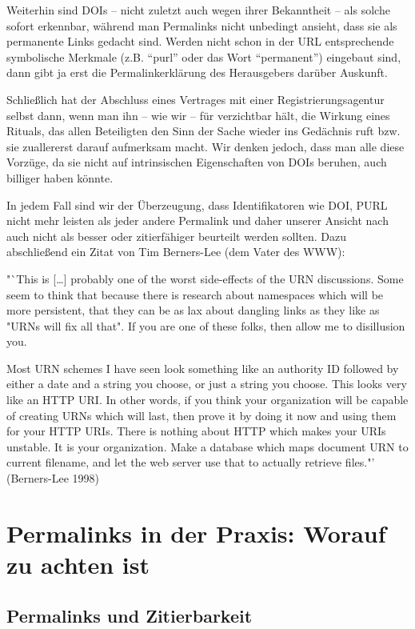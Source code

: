 \documentclass[12pt, a4paper]{article}
\begin{document}
Weiterhin sind DOIs -- nicht zuletzt auch wegen ihrer Bekanntheit --
als solche sofort erkennbar, während man Permalinks nicht unbedingt
ansieht, dass sie als permanente Links gedacht sind. Werden nicht schon in der URL
entsprechende symbolische Merkmale (z.B. ``purl'' oder das Wort
``permanent'') eingebaut sind, dann gibt ja erst die
Permalinkerklärung des Herausgebers darüber Auskunft.

Schließlich hat
der Abschluss eines Vertrages mit einer Registrierungsagentur selbst
dann, wenn man ihn -- wie wir -- für verzichtbar hält, die Wirkung eines
Rituals, das allen Beteiligten den Sinn der Sache wieder ins Gedächnis
ruft bzw. sie zuallererst darauf aufmerksam macht. Wir denken jedoch,
dass man alle diese Vorzüge, da sie nicht auf intrinsischen
Eigenschaften von DOIs beruhen, auch billiger haben könnte.

In jedem Fall sind wir der Überzeugung, dass Identifikatoren wie DOI,
PURL nicht mehr leisten als jeder andere Permalink und daher unserer
Ansicht nach auch nicht als besser oder zitierfähiger beurteilt werden
sollten. Dazu abschließend ein Zitat von Tim Berners-Lee (dem Vater
des WWW):

"`This is {[}\ldots{}{]} probably one of the worst side-effects of the
URN discussions. Some seem to think that because there is research
about namespaces which will be more persistent, that they can be as
lax about dangling links as they like as "URNs will fix all that". If
you are one of these folks, then allow me to disillusion you.

Most URN schemes I have seen look something like an authority ID
followed by either a date and a string you choose, or just a string
you choose. This looks very like an HTTP URI. In other words, if you
think your organization will be capable of creating URNs which will
last, then prove it by doing it now and using them for your HTTP
URIs. There is nothing about HTTP which makes your URIs unstable. It
is your organization. Make a database which maps document URN to
current filename, and let the web server use that to actually retrieve
files."'  (Berners-Lee 1998)

\section{Permalinks in der Praxis: Worauf zu achten ist}
\label{permalinks-in-der-praxis-worauf-zu-achten-ist}

\subsection{Permalinks und Zitierbarkeit}
\label{permalinks-und-zitierbarkeit}
\end{document}
